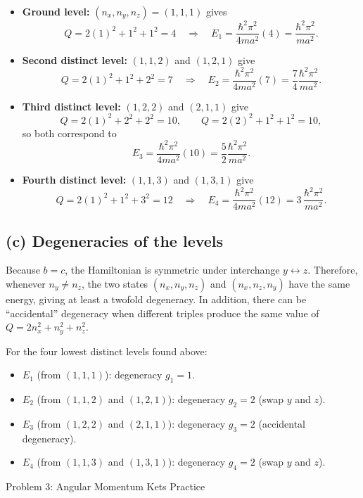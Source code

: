 \documentclass{article}
\begin{document}
\begin{itemize}
\item \textbf{Ground level:} $(n_x,n_y,n_z)=(1,1,1)$ gives
\[
Q=2(1)^2+1^2+1^2=4
\quad\Rightarrow\quad
E_1=\frac{\hbar^2\pi^2}{4ma^2}(4)=\frac{\hbar^2\pi^2}{ma^2}.
\]

\item \textbf{Second distinct level:} $(1,1,2)$ and $(1,2,1)$ give
\[
Q=2(1)^2+1^2+2^2=7
\quad\Rightarrow\quad
E_2=\frac{\hbar^2\pi^2}{4ma^2}(7)=\frac{7}{4}\frac{\hbar^2\pi^2}{ma^2}.
\]

\item \textbf{Third distinct level:} $(1,2,2)$ and $(2,1,1)$ give
\[
Q=2(1)^2+2^2+2^2=10,
\qquad
Q=2(2)^2+1^2+1^2=10,
\]
so both correspond to
\[
E_3=\frac{\hbar^2\pi^2}{4ma^2}(10)=\frac{5}{2}\frac{\hbar^2\pi^2}{ma^2}.
\]

\item \textbf{Fourth distinct level:} $(1,1,3)$ and $(1,3,1)$ give
\[
Q=2(1)^2+1^2+3^2=12
\quad\Rightarrow\quad
E_4=\frac{\hbar^2\pi^2}{4ma^2}(12)=3\,\frac{\hbar^2\pi^2}{ma^2}.
\]
\end{itemize}

\subsection*{(c) Degeneracies of the levels}

Because $b=c$, the Hamiltonian is symmetric under interchange $y\leftrightarrow z$.
Therefore, whenever $n_y\neq n_z$, the two states $(n_x,n_y,n_z)$ and $(n_x,n_z,n_y)$
have the same energy, giving at least a twofold degeneracy. In addition, there can be
``accidental'' degeneracy when different triples produce the same value of
$Q=2n_x^2+n_y^2+n_z^2$.

For the four lowest distinct levels found above:

\begin{itemize}
\item $E_1$ (from $(1,1,1)$): degeneracy $g_1=1$.
\item $E_2$ (from $(1,1,2)$ and $(1,2,1)$): degeneracy $g_2=2$ (swap $y$ and $z$).
\item $E_3$ (from $(1,2,2)$ and $(2,1,1)$): degeneracy $g_3=2$ (accidental degeneracy).
\item $E_4$ (from $(1,1,3)$ and $(1,3,1)$): degeneracy $g_4=2$ (swap $y$ and $z$).
\end{itemize}

\newpage

{\huge Problem 3: Angular Momentum Kets Practice}
\end{document}
